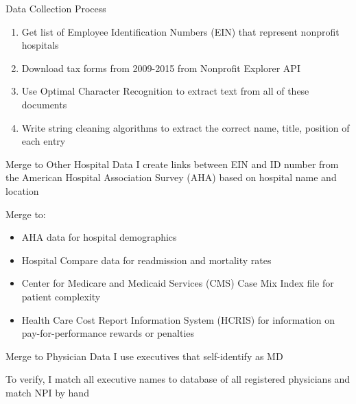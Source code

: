 \documentclass[notes,11pt, aspectratio=169]{beamer}
\begin{document}
\begin{frame}{Data Collection Process}
    \begin{enumerate}
        \item Get list of Employee Identification Numbers (EIN) that represent nonprofit hospitals

        \vspace{5mm}
        \item Download tax forms from 2009-2015 from Nonprofit Explorer API

        \vspace{5mm}
        \item Use Optimal Character Recognition to extract text from all of these documents

        \vspace{5mm}
        \item Write string cleaning algorithms to extract the correct name, title, position of each entry
    \end{enumerate}
\end{frame}

\begin{frame}{Merge to Other Hospital Data}
    I create links between EIN and ID number from the American Hospital Association Survey (AHA) based on hospital name and location

    \vspace{7mm}
    Merge to:

    \vspace{2mm}
    \begin{itemize}
        \item AHA data for hospital demographics
        \item Hospital Compare data for readmission and mortality rates
        \item Center for Medicare and Medicaid Services (CMS) Case Mix Index file for patient complexity
        \item Health Care Cost Report Information System (HCRIS) for information on pay-for-performance rewards or penalties
    \end{itemize}
\end{frame}

\begin{frame}{Merge to Physician Data}
    I use executives that self-identify as MD 

    \vspace{8mm}

    To verify, I match all executive names to database of all registered physicians and match NPI by hand
\end{frame}
\end{document}
